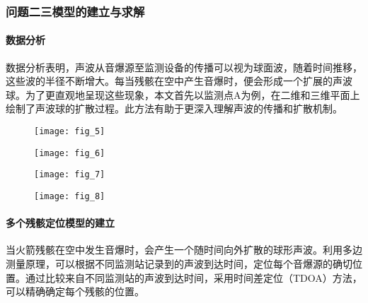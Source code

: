 \documentclass[withoutpreface,bwprint,12pt,a4paper]{cumcmthesis}
\begin{document}
\subsubsection{问题二三模型的建立与求解}

\paragraph{数据分析}

数据分析表明，声波从音爆源至监测设备的传播可以视为球面波，随着时间推移，这些波的半径不断增大。每当残骸在空中产生音爆时，便会形成一个扩展的声波球。为了更直观地呈现这些现象，本文首先以监测点A为例，在二维和三维平面上绘制了声波球的扩散过程。此方法有助于更深入理解声波的传播和扩散机制。

\begin{figure}[ht]
    \centering

    \begin{minipage}[c]{0.45\textwidth}
        \centering
        \texttt{[image: fig\_5]}
        \subcaption{} %
        \label{fig:5}  %
    \end{minipage}
    \hfill %
    \begin{minipage}[c]{0.45\textwidth}
        \centering
        \texttt{[image: fig\_6]}
        \subcaption{}
        \label{fig:6}
    \end{minipage}
    
    \begin{minipage}[c]{0.45\textwidth}
        \centering
        \texttt{[image: fig\_7]}
        \subcaption{}
        \label{fig:7}
    \end{minipage}
    \hfill %
    \begin{minipage}[c]{0.45\textwidth}
        \centering
        \texttt{[image: fig\_8]}
        \subcaption{}
        \label{fig:8}
    \end{minipage}
	\caption{} %
\end{figure}

\paragraph{多个残骸定位模型的建立}

当火箭残骸在空中发生音爆时，会产生一个随时间向外扩散的球形声波。利用多边测量原理，可以根据不同监测站记录到的声波到达时间，定位每个音爆源的确切位置。通过比较来自不同监测站的声波到达时间，采用时间差定位（TDOA）方法，可以精确确定每个残骸的位置。
\end{document}
